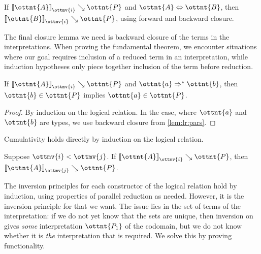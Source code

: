\documentclass[a4paper,UKenglish,cleveref,autoref,thm-restate]{lipics-v2021}
\begin{document}
\begin{corollary}[Conversion (l.r.)]
  If $ \mathopen{\llbracket}  \ottnt{A}  \mathclose{\rrbracket}_{ \ottmv{i} } \searrow  \ottnt{P} $ and $ \ottnt{A}  \Leftrightarrow  \ottnt{B} $,
  then $ \mathopen{\llbracket}  \ottnt{B}  \mathclose{\rrbracket}_{ \ottmv{i} } \searrow  \ottnt{P} $,
  using forward and backward closure.
\end{corollary}

The final closure lemma we need is backward closure of the terms in the interpretations.
When proving the fundamental theorem,
we encounter situations where our goal requires inclusion of a reduced term in an interpretation,
while induction hypotheses only piece together inclusion of the term before reduction.

\begin{lemma} \label{lem:lr:back}
  If $ \mathopen{\llbracket}  \ottnt{A}  \mathclose{\rrbracket}_{ \ottmv{i} } \searrow  \ottnt{P} $ and $ \ottnt{a}  \Rightarrow^\ast  \ottnt{b} $,
  then $ \ottnt{b}  \in  \ottnt{P} $ implies $ \ottnt{a}  \in  \ottnt{P} $.
\end{lemma}

\begin{proof}
  By induction on the logical relation.
  In the  case, where $\ottnt{a}$ and $\ottnt{b}$ are types,
  we use backward closure from \cref{lem:lr:pars}.
\end{proof}

Cumulativity holds directly by induction on the logical relation.

\begin{lemma}[Cumulativity (l.r.)] \label{lem:lr:cumul}
  Suppose $ \ottmv{i}  <  \ottmv{j} $. If $ \mathopen{\llbracket}  \ottnt{A}  \mathclose{\rrbracket}_{ \ottmv{i} } \searrow  \ottnt{P} $, then $ \mathopen{\llbracket}  \ottnt{A}  \mathclose{\rrbracket}_{ \ottmv{j} } \searrow  \ottnt{P} $.
\end{lemma}

The inversion principles for each constructor of the logical relation
hold by induction, using properties of parallel reduction as needed.
However, it is the inversion principle for  that we want.
The issue lies in the set of terms of the interpretation:
if we do not yet know that the sets are unique,
then inversion on  gives \emph{some} interpretation $\ottnt{P_{{\mathrm{1}}}}$ of the codomain,
but we do not know whether it is \emph{the} interpretation that is required.
We solve this by proving functionality.
\end{document}
